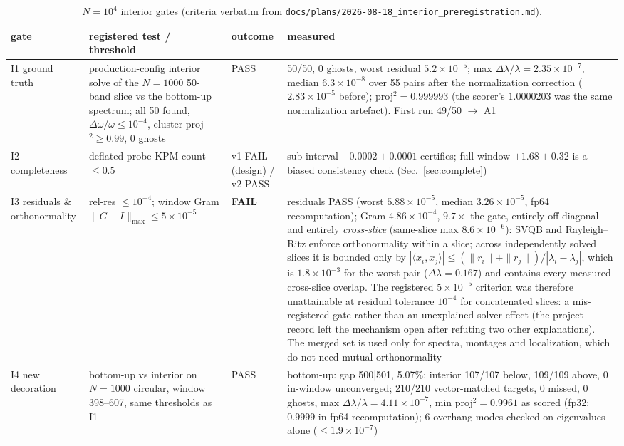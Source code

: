 \documentclass[aps,prl,preprint,superscriptaddress,longbibliography,nofootinbib]{revtex4-2}
\begin{document}
\begin{table}
\caption{$N=10^4$ interior gates (criteria verbatim from \texttt{docs/plans/2026-08-18\_interior\_preregistration.md}).}
\label{tab:gatesI}
\begin{tabular}{@{}p{1.9cm}p{4.8cm}p{1.8cm}p{7.1cm}@{}}
\hline\hline
gate & registered test / threshold & outcome & measured \\ \hline
I1 ground truth & production-config interior solve of the $N=1000$ 50-band slice vs the bottom-up spectrum; all 50 found, $\Delta\omega/\omega\le10^{-4}$, cluster proj$^2\ge0.99$, 0 ghosts & PASS & 50/50, 0 ghosts, worst residual $5.2\times10^{-5}$; max $\Delta\lambda/\lambda=2.35\times10^{-7}$, median $6.3\times10^{-8}$ over 55 pairs after the normalization correction ($2.83\times10^{-5}$ before); proj$^2=0.999993$ (the scorer's $1.0000203$ was the same normalization artefact). First run 49/50 $\to$ A1 \\
I2 completeness & deflated-probe KPM count $\le0.5$ & v1 FAIL (design) / v2 PASS & sub-interval $-0.0002\pm0.0001$ certifies; full window $+1.68\pm0.32$ is a biased consistency check (Sec.~\ref{sec:complete}) \\
I3 residuals \& orthonormality & rel-res $\le10^{-4}$; window Gram $\|G-I\|_{\max}\le5\times10^{-5}$ & \textbf{FAIL} & residuals PASS (worst $5.88\times10^{-5}$, median $3.26\times10^{-5}$, fp64 recomputation); Gram $4.86\times10^{-4}$, $9.7\times$ the gate, entirely off-diagonal and entirely \emph{cross-slice} (same-slice max $8.6\times10^{-6}$): SVQB and Rayleigh--Ritz enforce orthonormality within a slice; across independently solved slices it is bounded only by $|\langle x_i,x_j\rangle|\le(\|r_i\|+\|r_j\|)/|\lambda_i-\lambda_j|$, which is $1.8\times10^{-3}$ for the worst pair ($\Delta\lambda=0.167$) and contains every measured cross-slice overlap. The registered $5\times10^{-5}$ criterion was therefore unattainable at residual tolerance $10^{-4}$ for concatenated slices: a mis-registered gate rather than an unexplained solver effect (the project record left the mechanism open after refuting two other explanations). The merged set is used only for spectra, montages and localization, which do not need mutual orthonormality \\
I4 new decoration & bottom-up vs interior on $N=1000$ circular, window 398--607, same thresholds as I1 & PASS & bottom-up: gap 500|501, 5.07\%; interior 107/107 below, 109/109 above, 0 in-window unconverged; 210/210 vector-matched targets, 0 missed, 0 ghosts, max $\Delta\lambda/\lambda=4.11\times10^{-7}$, min proj$^2=0.9961$ as scored (fp32; $0.9999$ in fp64 recomputation); 6 overhang modes checked on eigenvalues alone ($\le1.9\times10^{-7}$) \\

\end{tabular}
\end{table}
\end{document}
